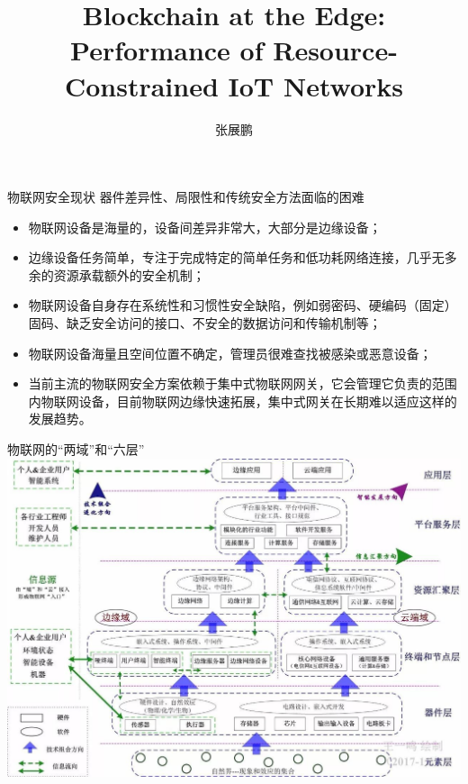 \documentclass{beamer}
\title{Blockchain at the Edge: Performance of Resource-Constrained IoT Networks}
\author{张展鹏}
\begin{document}
\begin{frame}[plain]
    \maketitle
\end{frame}

\begin{frame}{物联网安全现状}
	器件差异性、局限性和传统安全方法面临的困难
	\begin{itemize}
		\item 物联网设备是海量的，设备间差异非常大，大部分是边缘设备；
		\item 边缘设备任务简单，专注于完成特定的简单任务和低功耗网络连接，几乎无多余的资源承载额外的安全机制；
		\item 物联网设备自身存在系统性和习惯性安全缺陷，例如弱密码、硬编码（固定）固码、缺乏安全访问的接口、不安全的数据访问和传输机制等；
		\item 物联网设备海量且空间位置不确定，管理员很难查找被感染或恶意设备；
		\item 当前主流的物联网安全方案依赖于集中式物联网网关，它会管理它负责的范围内物联网设备，目前物联网边缘快速拓展，集中式网关在长期难以适应这样的发展趋势。
	\end{itemize}
\end{frame}

\begin{frame}{物联网的“两域”和“六层”}
	\includegraphics[width=\linewidth]{Assets/v2-7855b4b4d5101e18dc398cb0ca92d141_1440w}
\end{frame}
\end{document}
